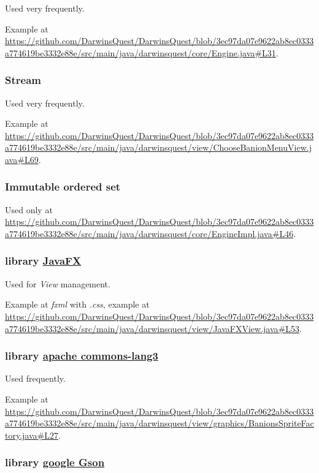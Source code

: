 \documentclass[12pt, a4paper]{report}
\begin{document}
        Used very frequently.

        Example at \url{https://github.com/DarwinsQuest/DarwinsQuest/blob/3ec97da07e9622ab8ec0333a774619be3332e88e/src/main/java/darwinsquest/core/Engine.java#L31}.

        \subsubsection{Stream}

        Used very frequently.

        Example at \url{https://github.com/DarwinsQuest/DarwinsQuest/blob/3ec97da07e9622ab8ec0333a774619be3332e88e/src/main/java/darwinsquest/view/ChooseBanionMenuView.java#L69}.

        \subsubsection{Immutable ordered set}

        Used only at \url{https://github.com/DarwinsQuest/DarwinsQuest/blob/3ec97da07e9622ab8ec0333a774619be3332e88e/src/main/java/darwinsquest/core/EngineImpl.java#L46}.

        \subsubsection{library \href{https://openjfx.io/}{JavaFX}}
        
        Used for \emph{View} management.

        Example at \textit{fxml} with \textit{.css}, example at \url{https://github.com/DarwinsQuest/DarwinsQuest/blob/3ec97da07e9622ab8ec0333a774619be3332e88e/src/main/java/darwinsquest/view/JavaFXView.java#L53}.
        
        \subsubsection{library \href{https://commons.apache.org/proper/commons-lang/}{apache commons-lang3}}
        
        Used frequently.

        Example at \url{https://github.com/DarwinsQuest/DarwinsQuest/blob/3ec97da07e9622ab8ec0333a774619be3332e88e/src/main/java/darwinsquest/view/graphics/BanionsSpriteFactory.java#L27}.
        
        \subsubsection{library \href{https://github.com/google/gson}{google Gson}}
        
\end{document}
